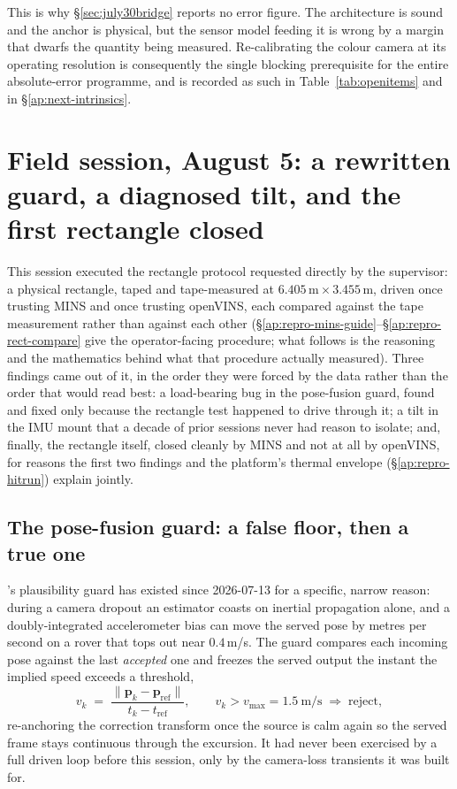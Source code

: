 This is why \S\ref{sec:july30bridge} reports no error figure. The
architecture is sound and the anchor is physical, but the sensor model
feeding it is wrong by a margin that dwarfs the quantity being measured.
Re-calibrating the colour camera at its operating resolution is consequently
the single blocking prerequisite for the entire absolute-error programme, and
is recorded as such in Table~\ref{tab:openitems} and in
\S\ref{ap:next-intrinsics}.

\section{Field session, August 5: a rewritten guard, a diagnosed tilt, and
the first rectangle closed}
\label{sec:aug05}

This session executed the rectangle protocol requested directly by the
supervisor: a physical rectangle, taped and tape-measured at
$6.405\,\text{m}\times3.455\,\text{m}$, driven once trusting MINS and once
trusting openVINS, each compared against the tape measurement rather than
against each other (\S\ref{ap:repro-mins-guide}--\S\ref{ap:repro-rect-compare}
give the operator-facing procedure; what follows is the reasoning and the
mathematics behind what that procedure actually measured). Three findings
came out of it, in the order they were forced by the data rather than the
order that would read best: a load-bearing bug in the pose-fusion guard, found
and fixed only because the rectangle test happened to drive through it; a
tilt in the IMU mount that a decade of prior sessions never had reason to
isolate; and, finally, the rectangle itself, closed cleanly by MINS and not
at all by openVINS, for reasons the first two findings and the platform's
thermal envelope (\S\ref{ap:repro-hitrun}) explain jointly.

\subsection{The pose-fusion guard: a false floor, then a true one}
\label{sec:aug05guard}
's plausibility guard has existed since 2026-07-13 for
a specific, narrow reason: during a camera dropout an estimator coasts on
inertial propagation alone, and a doubly-integrated accelerometer bias can
move the served pose by metres per second on a rover that tops out near
$0.4$\,m/s. The guard compares each incoming pose against the last
\emph{accepted} one and freezes the served output the instant the implied
speed exceeds a threshold,
\begin{equation}
v_k \;=\; \frac{\lVert \mathbf{p}_k - \mathbf{p}_{\text{ref}}\rVert}{t_k - t_{\text{ref}}},
\qquad
v_k > v_{\max}=1.5\ \text{m/s} \;\Rightarrow\; \text{reject},
\label{eq:guardspeed}
\end{equation}
re-anchoring the correction transform once the source is calm again so the
served frame stays continuous through the excursion. It had never been
exercised by a full driven loop before this session, only by the camera-loss
transients it was built for.

